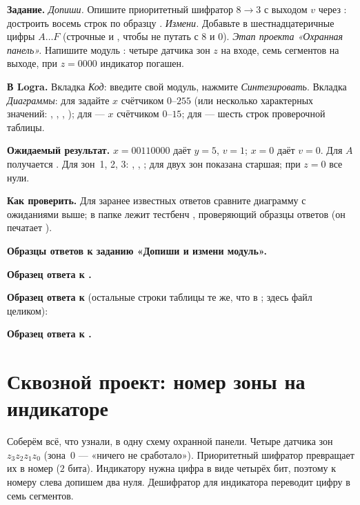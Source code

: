 \begin{diybox}
\textbf{Задание.}  \emph{Допиши.} Опишите приоритетный шифратор
$8\to3$ с выходом $v$ через : достроить восемь строк по образцу
.  \emph{Измени.} Добавьте в
 шестнадцатеричные цифры $A\ldots F$ (строчные  и
, чтобы не путать с $8$ и $0$).  \emph{Этап проекта
«Охранная панель».} Напишите модуль : четыре датчика зон
$z$ на входе, семь сегментов на выходе, при $z=0000$ индикатор погашен.

\textbf{В Logra.} Вкладка \emph{Код}: введите свой модуль, нажмите
\emph{Синтезировать}. Вкладка \emph{Диаграммы}: для  задайте $x$
счётчиком $0$--$255$ (или несколько характерных значений: ,
, , ); для  --- $x$
счётчиком $0$--$15$; для  --- шесть строк проверочной таблицы.

\textbf{Ожидаемый результат.}  $x=00110000$ даёт $y=5$, $v=1$;
$x=0$ даёт $v=0$.  Для $A$ получается . 
Для зон~1, 2, 3: , , ; для двух
зон показана старшая; при $z=0$ все нули.

\textbf{Как проверить.} Для заранее известных ответов сравните диаграмму с
ожиданиями выше; в папке  лежит тестбенч
, проверяющий образцы ответов (он печатает ).

\end{diybox}

\textbf{Образцы ответов к заданию «Допиши и измени модуль».}

\textbf{Образец ответа к .}

\textbf{Образец ответа к } (остальные строки таблицы те же, что в
; здесь файл целиком):

\textbf{Образец ответа к .}

\section{Сквозной проект: номер зоны на индикаторе}

Соберём всё, что узнали, в одну схему охранной панели. Четыре датчика зон
$z_3z_2z_1z_0$ (зона~0 --- «ничего не сработало»). Приоритетный шифратор
превращает их в номер ($2$ бита). Индикатору нужна цифра в виде
четырёх бит, поэтому к номеру слева допишем два нуля. Дешифратор для
индикатора переводит цифру в семь сегментов.

